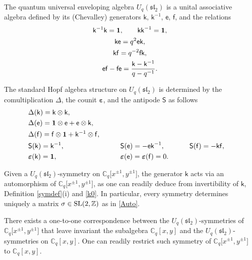 \documentclass[10pt,a4paper]{amsart}
\numberwithin{equation}{section}
\begin{document}
The quantum universal enveloping algebra $U_q(\mathfrak{sl}_2)$ is a unital associative algebra defined by its (Chevalley) generators $\mathsf{k}$, $\mathsf{k}^{-1}$, $\mathsf{e}$, $\mathsf{f}$, and the relations
\begin{gather}
\mathsf{k}^{-1}\mathsf{k} =\mathbf{1},\qquad\mathsf{kk}^{-1}=\mathbf{1},\notag\\
\mathsf{ke} =q^2\mathsf{ek},\label{ke}\\
\mathsf{kf} =q^{-2}\mathsf{fk},\label{kf}\\
\mathsf{ef}-\mathsf{fe} =\frac{\mathsf{k}-\mathsf{k}^{-1}}{q-q^{-1}}. \label{effe}
\end{gather}

The standard Hopf algebra structure on $U_q(\mathfrak{sl}_2)$ is determined by the comultiplication $\Delta$, the counit $\boldsymbol\varepsilon$, and the antipode $\mathsf{S}$ as follows
\begin{alignat}{4}
&\Delta(\mathsf{k})=\mathsf{k}\otimes\mathsf{k}, && && & \label{k0}\\
& \Delta(\mathsf{e}) =\mathbf{1}\otimes\mathsf{e}+ \mathsf{e}\otimes\mathsf{k}, && && & \label{def}\\
& \Delta(\mathsf{f}) =\mathsf{f}\otimes\mathbf{1}+\mathsf{k}^{-1}\otimes\mathsf{f},\qquad && && & \label{def1}\\
& \mathsf{S}(\mathsf{k}) =\mathsf{k}^{-1}, && \mathsf{S}(\mathsf{e}) =-\mathsf{ek}^{-1}, \qquad && \mathsf{S}(\mathsf{f}) =-\mathsf{kf}, &\notag\\
& \boldsymbol{\varepsilon}(\mathsf{k}) =\mathbf{1}, && \boldsymbol{\varepsilon}(\mathsf{e}) =\boldsymbol{\varepsilon}(\mathsf{f})=0.\qquad && &\notag
\end{alignat}

Given a $U_q(\mathfrak{sl}_2)$-symmetry on $\mathbb{C}_q\big[x^{\pm 1},y^{\pm 1}\big]$, the generator $\mathsf{k}$ acts via an automorphism of $\mathbb{C}_q\big[x^{\pm 1},y^{\pm 1}\big]$, as one can readily deduce from invertibility of $\mathsf{k}$, Definition \ref{symdef}(i) and \eqref{k0}. In particular, every symmetry determines uniquely a matrix $\sigma\in {\rm SL}(2,\mathbb{Z})$ as in \eqref{Auto}.

There exists a one-to-one correspondence between the $U_q(\mathfrak{sl}_2)$-symmetries of $\mathbb{C}_q\big[x^{\pm 1},y^{\pm 1}\big]$ that leave invariant the subalgebra $\mathbb{C}_q[x,y]$ and the $U_q(\mathfrak{sl}_2)$-symmetries on $\mathbb{C}_q[x,y]$. One can readily restrict such symmetry of $\mathbb{C}_q\big[x^{\pm 1},y^{\pm 1}\big]$ to $\mathbb{C}_q[x,y]$.
\end{document}
